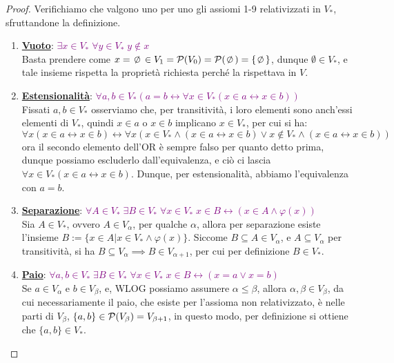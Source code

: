 \begin{proof}
	Verifichiamo che valgono uno per uno gli assiomi 1-9 relativizzati in $V_*$, sfruttandone la definizione.
	\begin{enumerate}[(1)]
		\item \textbf{\underline{Vuoto}}: \textcolor{purple}{$\exists x \in V_* \; \forall y \in V_* \; y \not \in x$} \\
		Basta prendere come $x = \emptyset \in V_1 = \ps(V_0) = \ps(\emptyset) = \{\emptyset\}$, dunque $\emptyset \in V_*$, e tale insieme rispetta la propriet\`a richiesta perch\'e la rispettava in $V$.
		\item \textbf{\underline{Estensionalit\`a}}: \textcolor{purple}{$\forall a,b \in V_* (a = b \leftrightarrow \forall x \in V_* (x \in a \leftrightarrow x \in b))$} \\
		Fissati $a,b \in V_*$ osserviamo che, per transitivit\`a, i loro elementi sono anch'essi elementi di $V_*$, quindi $x \in a$ o $x \in b$ implicano $x \in V_*$, per cui si ha:
		\[ \forall x (x \in a \leftrightarrow x \in b) \leftrightarrow \forall x (x \in V_* \land (x \in a \leftrightarrow x \in b) \lor x \not \in V_* \land (x \in a \leftrightarrow x \in b))
			\] 
		ora il secondo elemento dell'OR \`e sempre falso per quanto detto prima, dunque possiamo escluderlo dall'equivalenza, e ci\`o ci lascia $\forall x \in V_* (x \in a \leftrightarrow x \in b)$.
		Dunque, per estensionalit\`a, abbiamo l'equivalenza con $a = b$.
		\item \textbf{\underline{Separazione}}: \textcolor{purple}{$\forall A \in V_* \; \exists B \in V_* \; \forall x \in V_* \; x \in B \leftrightarrow (x \in A \land \varphi(x))$} \\
		Sia $A \in V_*$, ovvero $A \in V_\alpha$, per qualche $\alpha$, allora per separazione esiste l'insieme $B :=\{x \in A | x \in V_* \land \varphi(x)\}$. Siccome $B \subseteq A \in V_\alpha$, e $A \subseteq V_\alpha$ per transitivit\`a, si ha $B \subseteq V_\alpha \implies B \in V_{\alpha + 1}$, per cui per definizione $B \in V_*$.
		\item \textbf{\underline{Paio}}: \textcolor{purple}{$\forall a,b \in V_* \; \exists B \in V_* \; \forall x \in V_* \; x \in B \leftrightarrow (x = a \lor x = b)$} \\
		Se $a \in V_\alpha$ e $b \in V_\beta$, e, WLOG possiamo assumere $\alpha \leq \beta$, allora $\alpha, \beta \in V_\beta$, da cui necessariamente il paio, che esiste per l'assioma non relativizzato, \`e nelle parti di $V_\beta$, $\{a,b\} \in \mathcal{P}(V_\beta) = V_{\beta + 1}$, in questo modo, per definizione si ottiene che $\{a,b\} \in V_*$.

\end{enumerate}
\end{proof}
